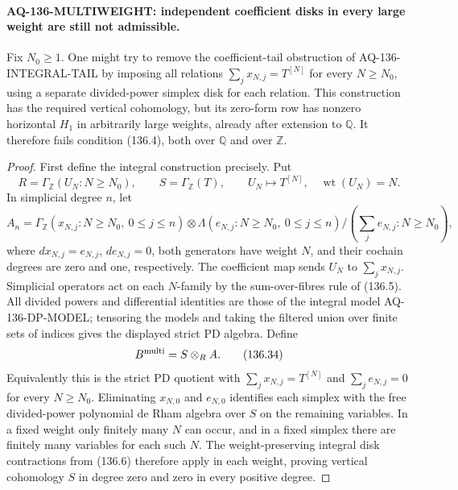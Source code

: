\paragraph{AQ-136-MULTIWEIGHT: independent coefficient disks in every large weight are still not admissible.}
Fix $N_0\geq1$.  One might try to remove the coefficient-tail
obstruction of AQ-136-INTEGRAL-TAIL by imposing all relations
$\sum_jx_{N,j}=T^{[N]}$ for every $N\geq N_0$, using a
separate divided-power simplex disk for each relation.
This construction has the required vertical cohomology,
but its zero-form row has nonzero horizontal $H_1$ in
arbitrarily large weights, already after extension to
$\mathbb Q$.  It therefore fails condition (136.4), both
over $\mathbb Q$ and over $\mathbb Z$.

\begin{proof}
First define the integral construction precisely.  Put
\[
 R=\Gamma_{\mathbb Z}(U_N:N\geq N_0),\qquad
 S=\Gamma_{\mathbb Z}(T),\qquad
 U_N\longmapsto T^{[N]},\quad \operatorname{wt}(U_N)=N.
                                                               \tag{136.32}
\]
In simplicial degree $n$, let
\[
 A_n=\Gamma_{\mathbb Z}(x_{N,j}:N\geq N_0,\ 0\leq j\leq n)
       \otimes\Lambda(e_{N,j}:N\geq N_0,\ 0\leq j\leq n)
       /(\textstyle\sum_j e_{N,j}:N\geq N_0),                \tag{136.33}
\]
where $d x_{N,j}=e_{N,j}$, $d e_{N,j}=0$, both generators
have weight $N$, and their cochain degrees are zero and
one, respectively.  The coefficient map sends
$U_N$ to $\sum_jx_{N,j}$.  Simplicial operators act on
each $N$-family by the sum-over-fibres rule of (136.5).
All divided powers and differential identities are those
of the integral model AQ-136-DP-MODEL; tensoring the
models and taking the filtered union over finite sets
of indices gives the displayed strict PD algebra.
Define
\[
                         B^{\rm multi}=S\otimes_R A.        \tag{136.34}
\]
Equivalently this is the strict PD quotient with
$\sum_jx_{N,j}=T^{[N]}$ and $\sum_j e_{N,j}=0$ for every
$N\geq N_0$.  Eliminating $x_{N,0}$ and $e_{N,0}$
identifies each simplex with the free divided-power
polynomial de Rham algebra over $S$ on the remaining
variables.  In a fixed weight only finitely many $N$
can occur, and in a fixed simplex there are finitely
many variables for each such $N$.  The weight-preserving
integral disk contractions from (136.6) therefore apply
in each weight, proving vertical cohomology $S$ in
degree zero and zero in every positive degree.


\end{proof}
